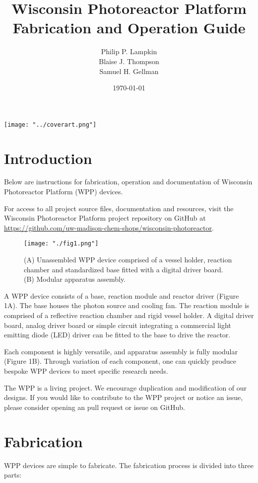 \documentclass[11pt]{article}
\title{Wisconsin Photoreactor Platform\\Fabrication and Operation Guide}
\author{
  Philip P. Lampkin \\
  Blaise J. Thompson \\
  Samuel H. Gellman
  }
\date{\today}
\let\stdsection\section
\renewcommand\section{\clearpage\stdsection}
\begin{document}
\maketitle

\texttt{[image: "../coverart.png"]}

\tableofcontents

\section{Introduction}

Below are instructions for fabrication, operation and documentation of Wisconsin Photoreactor Platform (WPP) devices.

For access to all project source files, documentation and resources, visit the Wisconsin Photoreactor Platform project repository on GitHub at \href{https://github.com/uw-madison-chem-shops/wisconsin-photoreactor}{https://github.com/uw-madison-chem-shops/wisconsin-photoreactor}.

\begin{figure}[H]
	\texttt{[image: "./fig1.png"]}
	\caption{(A) Unassembled WPP device comprised of a vessel holder, reaction chamber and standardized base fitted with a digital driver board. (B) Modular apparatus assembly.}
\end{figure}
A WPP device consists of a base, reaction module and reactor driver (Figure 1A).
The base houses the photon source and cooling fan.
The reaction module is comprised of a reflective reaction chamber and rigid vessel holder.
A digital driver board, analog driver board or simple circuit integrating a commercial light emitting diode (LED) driver can be fitted to the base to drive the reactor.

Each component is highly versatile, and apparatus assembly is fully modular (Figure 1B).
Through variation of each component, one can quickly produce bespoke WPP devices to meet specific research needs.

The WPP is a living project.
We encourage duplication and modification of our designs.
If you would like to contribute to the WPP project or notice an issue, please consider opening an pull request or issue on GitHub.

\section{Fabrication}

WPP devices are simple to fabricate.
The fabrication process is divided into three parts:
\end{document}
